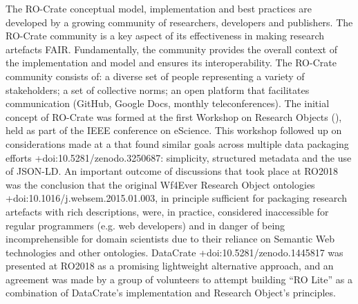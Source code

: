 \markdownRendererInterblockSeparator
{}The RO-Crate conceptual model, implementation and best practices are developed by a growing community of researchers, developers and publishers. The RO-Crate community is a key aspect of its effectiveness in making research artefacts FAIR. Fundamentally, the community provides the overall context of the implementation and model and ensures its interoperability. \markdownRendererInterblockSeparator
{}The RO-Crate community consists of:\markdownRendererInterblockSeparator
{}\markdownRendererOlBeginTight
{}a diverse set of people representing a variety of stakeholders;\markdownRendererOlItemEnd 
{}a set of collective norms;\markdownRendererOlItemEnd 
{}an open platform that facilitates communication (GitHub, Google Docs, monthly teleconferences).\markdownRendererOlItemEnd 
\markdownRendererOlEndTight \markdownRendererInterblockSeparator
{}\markdownRendererInterblockSeparator
{}The initial concept of RO-Crate was formed at the first Workshop on Research Objects (), held as part of the IEEE conference on eScience. This workshop followed up on considerations made at a  that found similar goals across multiple data packaging efforts +{}{}{doi:10.5281/zenodo.3250687}: simplicity, structured metadata and the use of JSON-LD.\markdownRendererInterblockSeparator
{}An important outcome of discussions that took place at RO2018 was the conclusion that the original Wf4Ever Research Object ontologies +{}{}{doi:10.1016/j.websem.2015.01.003}, in principle sufficient for packaging research artefacts with rich descriptions, were, in practice, considered inaccessible for regular programmers (e.g. web developers) and in danger of being incomprehensible for domain scientists due to their reliance on Semantic Web technologies and other ontologies.\markdownRendererInterblockSeparator
{}DataCrate +{}{}{doi:10.5281/zenodo.1445817} was presented at RO2018 as a promising lightweight alternative approach, and an agreement was made by a group of volunteers to attempt building “RO Lite” as a combination of DataCrate's implementation and Research Object's principles.\markdownRendererInterblockSeparator
